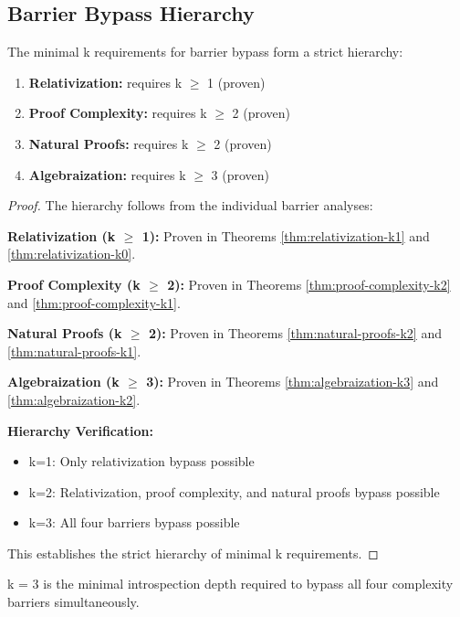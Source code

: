 \documentclass[11pt]{article}
\begin{document}
\subsection{Barrier Bypass Hierarchy}

\begin{theorem}
\label{thm:barrier-hierarchy}
The minimal k requirements for barrier bypass form a strict hierarchy:
\begin{enumerate}
\item \textbf{Relativization:} requires k $\geq$ 1 (proven)
\item \textbf{Proof Complexity:} requires k $\geq$ 2 (proven)
\item \textbf{Natural Proofs:} requires k $\geq$ 2 (proven)
\item \textbf{Algebraization:} requires k $\geq$ 3 (proven)
\end{enumerate}
\end{theorem}

\begin{proof}
The hierarchy follows from the individual barrier analyses:

\textbf{Relativization (k $\geq$ 1):} Proven in Theorems \ref{thm:relativization-k1} and \ref{thm:relativization-k0}.

\textbf{Proof Complexity (k $\geq$ 2):} Proven in Theorems \ref{thm:proof-complexity-k2} and \ref{thm:proof-complexity-k1}.

\textbf{Natural Proofs (k $\geq$ 2):} Proven in Theorems \ref{thm:natural-proofs-k2} and \ref{thm:natural-proofs-k1}.

\textbf{Algebraization (k $\geq$ 3):} Proven in Theorems \ref{thm:algebraization-k3} and \ref{thm:algebraization-k2}.

\textbf{Hierarchy Verification:}
\begin{itemize}
\item k=1: Only relativization bypass possible
\item k=2: Relativization, proof complexity, and natural proofs bypass possible
\item k=3: All four barriers bypass possible
\end{itemize}

This establishes the strict hierarchy of minimal k requirements.
\end{proof}

\begin{corollary}
\label{cor:optimal-k}
k = 3 is the minimal introspection depth required to bypass all four complexity barriers simultaneously.
\end{corollary}
\end{document}
